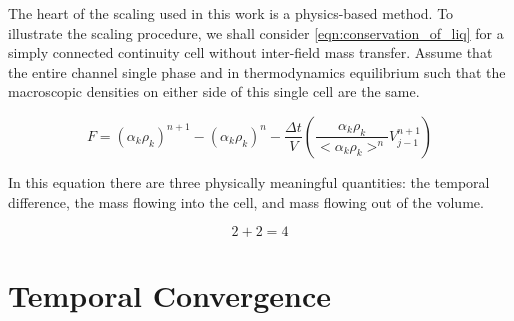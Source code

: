 The heart of the scaling used in this work is a physics-based method.
To illustrate the scaling procedure, we shall consider \eqref{eqn:conservation_of_liq} for a simply connected continuity cell without inter-field mass transfer.
Assume that the entire channel single phase and in thermodynamics equilibrium such that the macroscopic densities on either side of this single cell are the same.

\begin{equation}
F = \left(\alpha_k \rho_k\right)^{n+1} - \left( \alpha_k \rho_k \right)^n - \frac{\Delta t}{V} \left( \frac{\alpha_k \rho_k }{<\alpha_k \rho_k>^n} V^{n+1}_{j-1} \right)
\end{equation}

In this equation there are three physically meaningful quantities: the temporal difference, the mass flowing into the cell, and mass flowing out of the volume. 

\begin{equation}
\label{eqn:scaled_residual}
2 + 2 = 4
\end{equation}

\section{Temporal Convergence}
\label{sect:temporal_convergence}



